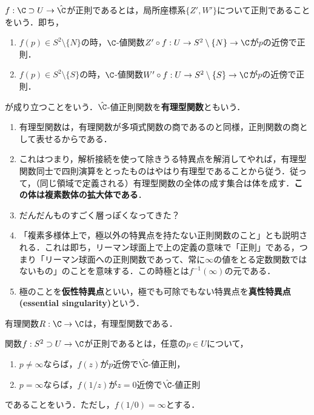\documentclass[uplatex, dvipdfmx]{jsreport}
\begin{document}
\begin{definition}
    $f:\C\supset U\to\hat{\C}$が正則であるとは，局所座標系$\{Z',W'\}$について正則であることをいう．即ち，
    \begin{enumerate}
        \item $f(p)\in S^2\setminus\{N\}$の時，$\C$-値関数$Z'\circ f:U\to S^2\setminus\{N\}\to\C$が$p$の近傍で正則．
        \item $f(p)\in S^2\setminus\{S\}$の時，$\C$-値関数$W'\circ f:U\to S^2\setminus\{S\}\to\C$が$p$の近傍で正則．
    \end{enumerate}
    が成り立つことをいう．$\hat{\C}$-値正則関数を\textbf{有理型関数}ともいう．
\end{definition}
\begin{remark}\mbox{}
    \begin{enumerate}
        \item 有理型関数は，有理関数が多項式関数の商であるのと同様，正則関数の商として表せるからである．
        \item これはつまり，解析接続を使って除きうる特異点を解消してやれば，有理型関数同士で四則演算をとったものはやはり有理型であることから従う．従って，（同じ領域で定義される）有理型関数の全体の成す集合は体を成す．\textbf{この体は複素数体の拡大体である}．
        \item だんだんものすごく層っぽくなってきた？
        \item 「複素多様体上で，極以外の特異点を持たない正則関数のこと」とも説明される．これは即ち，リーマン球面上で上の定義の意味で「正則」である，つまり「リーマン球面への正則関数であって、常に$\infty$の値をとる定数関数ではないもの」のことを意味する．この時極とは$f^{-1}(\infty)$の元である．
        \item 極のことを\textbf{仮性特異点}といい，極でも可除でもない特異点を\textbf{真性特異点(essential singularity)}という．
    \end{enumerate}
\end{remark}

\begin{proposition}
    有理関数$R:\C\to\C$は，有理型関数である．
\end{proposition}

\begin{definition}
    関数$f:S^2\supset U\to\C$が正則であるとは，任意の$p\in U$について，
    \begin{enumerate}
        \item $p\ne\infty$ならば，$f(z)$が$p$近傍で$\hat{\C}$-値正則，
        \item $p=\infty$ならば，$f(1/z)$が$z=0$近傍で$\hat{\C}$-値正則
    \end{enumerate}
    であることをいう．ただし，$f(1/0)=\infty$とする．
\end{definition}
\end{document}
